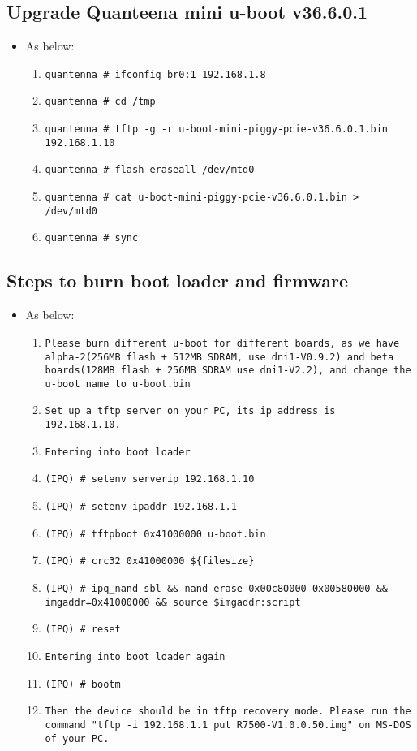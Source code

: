 \documentclass[12pt]{report}
\begin{document}
    \subsection{Upgrade Quanteena mini u-boot v36.6.0.1}
    \begin{itemize}
    \item As below:
    	\begin{enumerate}
		\item \texttt{quantenna \# ifconfig br0:1 192.168.1.8}
		\item \texttt{quantenna \# cd /tmp}
		\item \texttt{quantenna \# tftp -g -r u-boot-mini-piggy-pcie-v36.6.0.1.bin 192.168.1.10}
		\item \texttt{quantenna \# flash\_eraseall /dev/mtd0}
		\item \texttt{quantenna \# cat u-boot-mini-piggy-pcie-v36.6.0.1.bin > /dev/mtd0}
		\item \texttt{quantenna \# sync}
    	\end{enumerate}
    \end{itemize}

    \subsection{Steps to burn boot loader and firmware}
    \begin{itemize}
    \item As below:
            \begin{enumerate}
	    	\item \texttt{Please burn different u-boot for different boards, as we have alpha-2(256MB flash + 512MB SDRAM, use dni1-V0.9.2) and beta boards(128MB flash + 256MB SDRAM use dni1-V2.2), and change the u-boot name to u-boot.bin}
		\item \texttt{Set up a tftp server on your PC, its ip address is 192.168.1.10.}
		\item \texttt{Entering into boot loader}
		\item \texttt{(IPQ) \# setenv serverip 192.168.1.10}
		\item \texttt{(IPQ) \# setenv ipaddr 192.168.1.1}
		\item \texttt{(IPQ) \# tftpboot 0x41000000 u-boot.bin}
		\item \texttt{(IPQ) \# crc32 0x41000000 \$\{filesize\}}
		\item \texttt{(IPQ) \# ipq\_nand sbl \&\& nand erase 0x00c80000 0x00580000 \&\& imgaddr=0x41000000 \&\& source \$imgaddr:script}
		\item \texttt{(IPQ) \# reset}
		\item \texttt{Entering into boot loader again}
		\item \texttt{(IPQ) \# bootm}
		\item \texttt{Then the device should be in tftp recovery mode. Please run the command "tftp -i 192.168.1.1 put R7500-V1.0.0.50.img" on MS-DOS of your PC.}
            \end{enumerate}
    \end{itemize}
\end{document}
